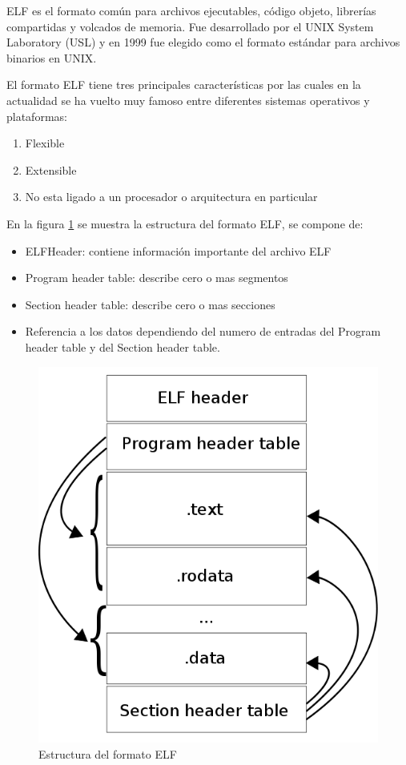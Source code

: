 \ac{ELF} es el formato común para archivos ejecutables, código objeto,
librerías compartidas y volcados de memoria. Fue desarrollado por
el UNIX System Laboratory (USL) y en 1999 fue elegido como el formato
estándar para archivos binarios en UNIX.

El formato \ac{ELF} tiene tres principales características por las
cuales en la actualidad se ha vuelto muy famoso entre diferentes sistemas
operativos y plataformas:
\begin{enumerate}
\item Flexible
\item Extensible
\item No esta ligado a un procesador o arquitectura en particular
\end{enumerate}
En la figura \ref{Flo:estructuraELF.png} se muestra la estructura
del formato \ac{ELF}, se compone de: 
\begin{itemize}
\item \ac{ELF}Header: contiene información importante del archivo \ac{ELF}
\item Program header table: describe cero o mas segmentos
\item Section header table: describe cero o mas secciones
\item Referencia a los datos dependiendo del numero de entradas del Program
header table y del Section header table.
\end{itemize}
%
\begin{figure}[!h]


\begin{centering}
\includegraphics[scale=0.5]{img/estructuraELF}\caption{Estructura del formato ELF}
\label{Flo:estructuraELF.png}
\par\end{centering}


\end{figure}


